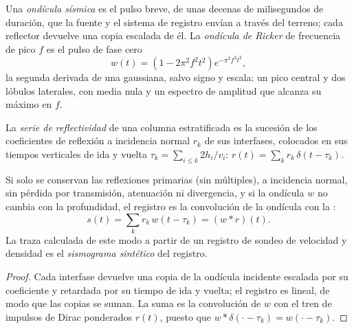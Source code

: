 \begin{definition}\label{def:b3:exploration-seismology:wavelet}
Una \emph{ondícula sísmica} es el pulso breve, de unas
decenas de milisegundos de duración, que la fuente y el sistema de registro
envían a través del terreno; cada reflector devuelve una copia escalada de él. La \emph{ondícula
de Ricker} de frecuencia de pico $f$ es el pulso de fase cero
\[
  w(t) = \left(1 - 2\pi^2f^2t^2\right)e^{-\pi^2f^2t^2},
\]
la segunda derivada de una gaussiana, salvo signo y escala: un pico central y
dos lóbulos laterales, con media nula y un espectro de amplitud que alcanza su máximo en $f$.
\end{definition}

\begin{definition}\label{def:b3:exploration-seismology:synthetic}
La \emph{serie de reflectividad} de una columna
estratificada es la sucesión de los coeficientes de reflexión a incidencia normal $r_k$ de sus interfases,
colocados en sus tiempos verticales de ida y vuelta $\tau_k = \sum_{i \le k} 2h_i/v_i$:
$r(t) = \sum_k r_k\,\delta(t - \tau_k)$.
\end{definition}

\begin{proposition}\label{prop:b3:exploration-seismology:synthetic}
Si solo se conservan las reflexiones primarias (sin múltiples), a incidencia
normal, sin pérdida por transmisión, atenuación ni divergencia, y si la ondícula
$w$ no cambia con la profundidad, el registro es la convolución de la ondícula
con la :
\[
  s(t) = \sum_k r_k\,w(t - \tau_k) = (w*r)(t) .
\]
La traza calculada de este modo a partir de un registro de sondeo de velocidad y
densidad es el \emph{sismograma sintético} del registro.
\end{proposition}

\begin{proof}
Cada interfase devuelve una copia de la ondícula incidente escalada por su
coeficiente y retardada por su tiempo de ida y vuelta; el registro es lineal, de modo que las copias se suman.
La suma es la convolución de $w$ con el tren de impulsos de Dirac ponderados
$r(t)$, puesto que $w*\delta(\cdot - \tau_k) = w(\cdot - \tau_k)$.
\end{proof}

